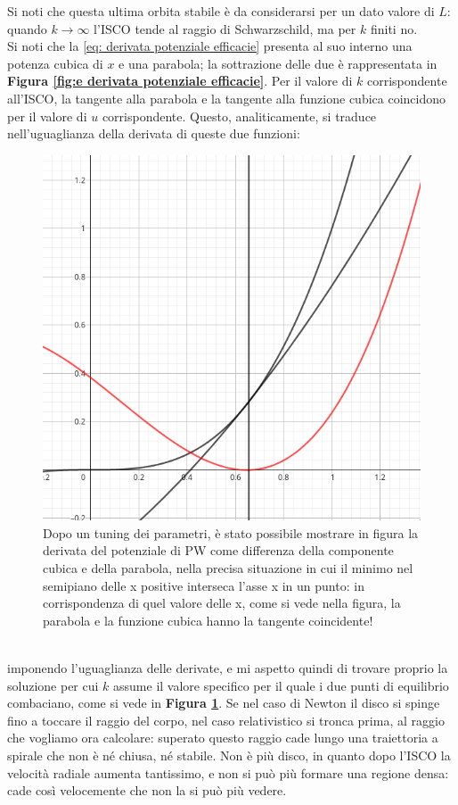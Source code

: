 Si noti che questa ultima orbita stabile è da considerarsi per un dato valore di $L$: quando $k\xrightarrow{}\infty$ l'ISCO tende al raggio di Schwarzschild, ma per $k$ finiti no.\\
Si noti che la \eqref{eq: derivata potenziale efficacie} presenta al suo interno una potenza cubica di $x$ e una parabola; la sottrazione delle due è rappresentata in \textbf{Figura \ref{fig:e derivata potenziale efficacie}}.
Per il valore di $k$ corrispondente all'ISCO, la tangente alla parabola e la tangente alla funzione cubica coincidono per il valore di $u$ corrispondente. 
Questo, analiticamente, si traduce nell'uguaglianza della derivata di queste due funzioni: 
\begin{figure}[h!]
    \centering
    \includegraphics[width=0.5\linewidth]{Immagini/PWpot_fine_tuning.png}
    \caption{Dopo un tuning dei parametri, è stato possibile mostrare in figura la derivata del potenziale di PW come differenza della componente cubica e della parabola, nella precisa situazione in cui il minimo nel semipiano delle x positive interseca l'asse x in un punto: in corrispondenza di quel valore delle x, come si vede nella figura, la parabola e la funzione cubica hanno la tangente coincidente!}
    \label{fig:PW derivative fine tuned}
\end{figure}\\
imponendo l'uguaglianza delle derivate, e mi aspetto quindi di trovare proprio la soluzione per cui $k$ assume il valore specifico per il quale i due punti di equilibrio combaciano, come si vede in \textbf{Figura \ref{fig:PW derivative fine tuned}}.
Se nel caso di Newton il disco si spinge fino a toccare il raggio del corpo, nel caso relativistico si tronca prima, al raggio che vogliamo ora calcolare: superato questo raggio cade lungo una traiettoria a spirale che non è né chiusa, né stabile.
Non è più disco, in quanto dopo l'ISCO la velocità radiale aumenta tantissimo, e non si può più formare una regione densa: cade così velocemente che non la si può più vedere.
